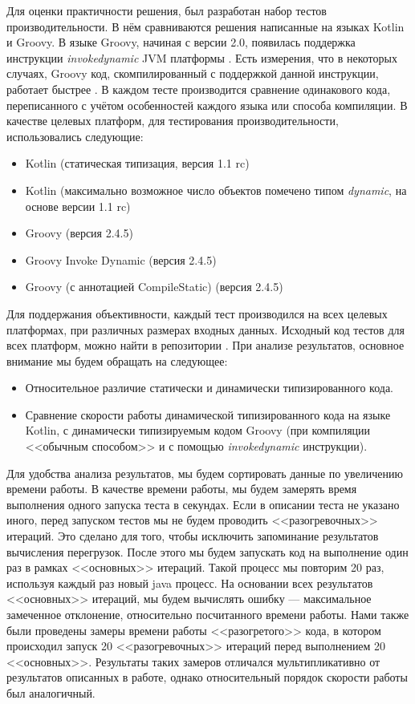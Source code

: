 Для оценки практичности решения, был разработан набор тестов производительности. В нём сравниваются решения написанные на языках Kotlin и Groovy. В языке Groovy, начиная с версии 2.0, появилась поддержка инструкции \textit{invokedynamic} JVM платформы \cite{groovy:invokeDynamicSupport}. Есть измерения, что в некоторых случаях, Groovy код, скомпилированный с поддержкой данной инструкции, работает быстрее \cite{groovy:indyTest1}.
В каждом тесте производится сравнение одинакового кода, переписанного с учётом особенностей каждого языка или способа компиляции. В качестве целевых платформ, для тестирования производительности, использовались следующие:

\begin{itemize}
    \item Kotlin (статическая типизация, версия 1.1 rc) 
    \item Kotlin (максимально возможное число объектов помечено типом \textit{dynamic}, на основе версии 1.1 rc)
    \item Groovy (версия 2.4.5)
    \item Groovy Invoke Dynamic (версия 2.4.5)
    \item Groovy (с аннотацией CompileStatic) (версия 2.4.5)
\end{itemize}


Для поддержания объективности, каждый тест производился на всех целевых платформах, при различных размерах входных данных. Исходный код тестов для всех платформ, можно найти в репозитории \cite{github:myBenchs}. При анализе результатов, основное внимание мы будем обращать на следующее:

\begin{itemize}
    \item Относительное различие статически и динамически типизированного кода.
    \item Сравнение скорости работы динамической типизированного кода на языке Kotlin, с динамически типизируемым кодом Groovy (при компиляции <<обычным способом>> и с помощью \textit{invokedynamic} инструкции).
\end{itemize}

Для удобства анализа результатов, мы будем сортировать данные по увеличению времени работы. В качестве времени работы, мы будем замерять время выполнения одного запуска теста в секундах. Если в описании теста не указано иного, перед запуском тестов мы не будем проводить <<разогревочных>> итераций. Это сделано для того, чтобы исключить запоминание результатов вычисления перегрузок. После этого мы будем запускать код на выполнение один раз в рамках <<основных>> итераций. Такой процесс мы повторим 20 раз, используя каждый раз новый java процесс. На основании всех результатов <<основных>> итераций, мы будем вычислять ошибку --- максимальное замеченное отклонение, относительно посчитанного времени работы. Нами также были проведены замеры времени работы <<разогретого>> кода, в котором происходил запуск 20 <<разогревочных>> итераций перед выполнением 20 <<основных>>. Результаты таких замеров отличался мультипликативно от результатов описанных в работе, однако относительный порядок скорости работы был аналогичный.

